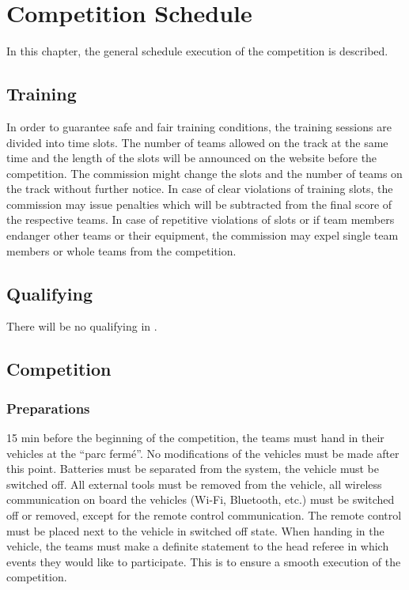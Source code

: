 \chapter{Competition Schedule}

In this chapter, the general schedule execution of the competition is
described.

\section{Training}

In order to guarantee safe and fair training conditions, the training sessions
are divided into time slots. The number of teams allowed on the track at the
same time and the length of the slots will be announced on the website before
the competition. The commission might change the slots and the number of teams
on the track without further notice. In case of clear violations of training
slots, the commission may issue penalties which will be subtracted from the
final score of the respective teams. In case of repetitive violations of slots
or if team members endanger other teams or their equipment, the commission may
expel single team members or whole teams from the competition.

\section{Qualifying}

There will be no qualifying in \the\year{}.

\section{Competition}
\subsection{Preparations}

15 min before the beginning of the competition, the teams must hand in their vehicles at the “parc fermé”. No modifications of the vehicles must be made after this point. Batteries must be separated from the system, the vehicle must be switched off. All external tools must be removed from the vehicle, all wireless communication on board the vehicles (Wi-Fi, Bluetooth, etc.) must be switched off or removed, except for the remote control communication. The remote control must be placed next to the vehicle in switched off state. When handing in the vehicle, the teams must make a definite statement to the head referee in which events they would like to participate. This is to ensure a smooth execution of the competition.

